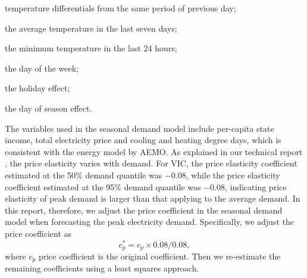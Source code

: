 \documentclass[11pt]{article}
\begin{document}
\item temperature differentials from the same period of previous day;

\item the average temperature in the last seven days;

\item the minimum temperature in the last 24 hours;

\item the day of the week;

\item the holiday  effect;

\item the day of season effect.

\eiz







The variables used in the seasonal demand model include per-capita state income, total electricity price and cooling and heating degree days, which is consistent with the energy model by AEMO\@. As explained in our technical report \citep{Tech15}, the price elasticity varies with demand. For VIC, the price elasticity coefficient estimated at the 50\% demand quantile was $-0.08$, while the price elasticity coefficient estimated at the 95\% demand quantile was $-0.08$, indicating price elasticity of peak demand is larger than that applying to the average demand. In this report, therefore, we adjust the price coefficient in the seasonal demand model when forecasting the peak electricity demand. Specifically, we adjust the price coefficient as
\[
 c^*_{p}= c_{p} \times 0.08 / 0.08,
\]
where $c_{p}$ price coefficient is the original coefficient.
Then we re-estimate the remaining coefficients using a least squares approach.
\end{document}
